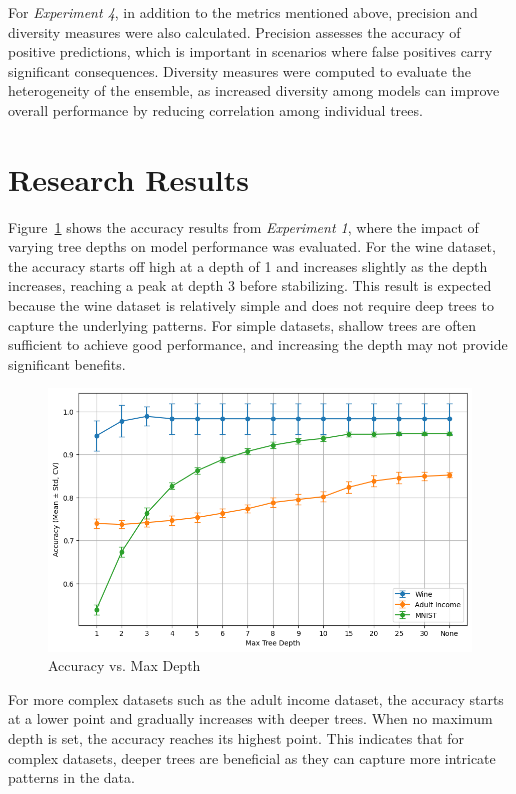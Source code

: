 \documentclass[conference]{IEEEtran}
\begin{document}
For \textit{Experiment 4}, in addition to the metrics mentioned above, precision and diversity measures were also calculated. Precision assesses the accuracy of positive predictions, which is important in scenarios where false positives carry significant consequences. Diversity measures were computed to evaluate the heterogeneity of the ensemble, as increased diversity among models can improve overall performance by reducing correlation among individual trees.
\section{Research Results}

Figure~\ref{fig:accuracy_vs_depth} shows the accuracy results from \textit{Experiment 1}, where the impact of varying tree depths on model performance was evaluated. For the wine dataset, the accuracy starts off high at a depth of 1 and increases slightly as the depth increases, reaching a peak at depth 3 before stabilizing. This result is expected because the wine dataset is relatively simple and does not require deep trees to capture the underlying patterns. For simple datasets, shallow trees are often sufficient to achieve good performance, and increasing the depth may not provide significant benefits.


\begin{figure}
    \centering
    \includegraphics[width=\linewidth]{figures/accuracy_vs_depth.png}
    \caption{Accuracy vs. Max Depth}
    \label{fig:accuracy_vs_depth}
\end{figure}

For more complex datasets such as the adult income dataset, the accuracy starts at a lower point and gradually increases with deeper trees. When no maximum depth is set, the accuracy reaches its highest point. This indicates that for complex datasets, deeper trees are beneficial as they can capture more intricate patterns in the data.
\end{document}
